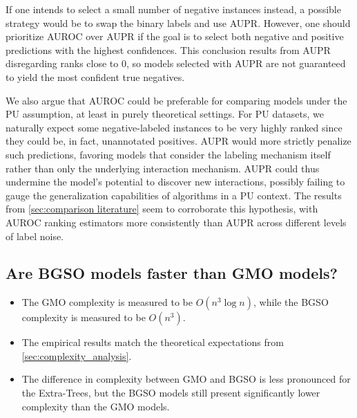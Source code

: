 If one intends to select a small number of negative instances instead, a possible strategy would be to swap the binary labels and use AUPR.
However, one should prioritize AUROC over AUPR if the goal is to select both negative and positive predictions with the highest confidences. This conclusion results from AUPR disregarding ranks close to $0$, so models selected with AUPR are not guaranteed to yield the most confident true negatives.

We also argue that AUROC could be preferable for comparing models under the PU assumption, at least in purely theoretical settings. For PU datasets, we naturally expect some negative-labeled instances to be very highly ranked since they could be, in fact, unannotated positives. AUPR would more strictly penalize such predictions, favoring models that consider the labeling mechanism itself rather than only the underlying interaction mechanism. AUPR could thus undermine the model's potential to discover new interactions, possibly failing to gauge the generalization capabilities of algorithms in a PU context. The results from \autoref{sec:comparison literature} seem to corroborate this hypothesis, with AUROC ranking estimators more consistently than AUPR across different levels of label noise.


\subsection{Are BGSO models faster than GMO models?}
\label{sec:empirical_complexity}

\begin{mdframed}[frametitle={Key findings}]
    \begin{itemize}
        \item The GMO complexity is measured to be $O(n^3\log n)$, while the BGSO complexity is measured to be $O(n^3)$.

        \item The empirical results match the theoretical expectations from \autoref{sec:complexity_analysis}.
        
        \item The difference in complexity between GMO and BGSO is less pronounced for the Extra-Trees, but the BGSO models still present significantly lower complexity than the GMO models.
    \end{itemize}
\end{mdframed}

